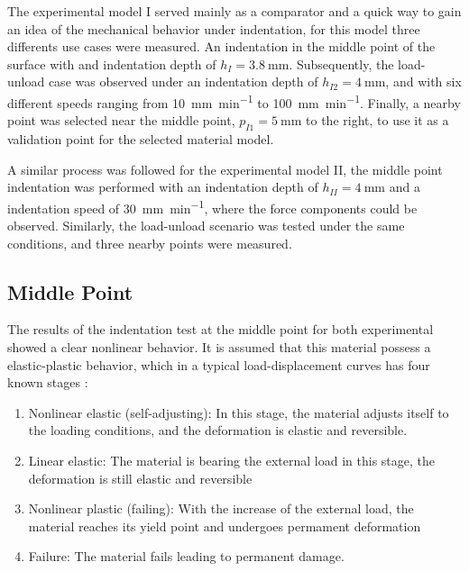 The experimental model I served mainly as a comparator and a quick way to gain an idea of the 
mechanical behavior under indentation, for this model three differents use cases were measured. 
An indentation in the middle point of the surface with and indentation depth of $h_{I} = \SI{3.8}{\milli \m}$. 
Subsequently, the load-unload case was observed under an indentation depth of  $h_{I2} = \SI{4}{\milli \m}$, and 
with six different speeds ranging from \SI[per-mode = symbol]{10}{\milli \m\per \minute} to 
\SI[per-mode = symbol]{100}{\milli \m\per \minute}. 
Finally, a nearby point was selected near the middle point, $p_{I1} = \SI{5}{\milli \m}$ to the right,
 to use it as a validation point for the selected material model. 

A similar process was followed for the experimental model II, the middle point indentation was 
performed with an indentation depth of $h_{II} = \SI{4}{\milli \m}$ and a indentation 
speed of \SI[per-mode = symbol]{30}{\milli \m\per \minute}, where the force components 
could be observed. Similarly, the load-unload scenario was tested under the same conditions, and three 
nearby points were measured.

\subsection{Middle Point}
\label{subsection:midpointresult}
The results of the indentation test at the middle point for both experimental showed a clear 
nonlinear behavior.  It is assumed that this material 
possess a elastic-plastic behavior, which in a typical load-displacement curves has four known stages \cite{Goharian2017}:

\begin{enumerate}
    \item Nonlinear elastic (self-adjusting): In this stage, the material adjusts itself to the loading conditions, and the deformation is elastic and reversible.
    \item Linear elastic: The material is bearing the external load in this stage, the deformation is still elastic and reversible 
    \item Nonlinear plastic (failing): With the increase of the external load, the material reaches its yield point and undergoes permament deformation
    \item Failure: The material fails leading to permanent damage.
\end{enumerate}



